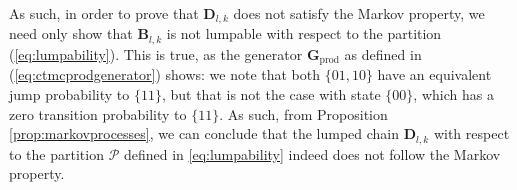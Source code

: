 As such, in order to prove that $\mathbf{D}_{l, k}$ does not satisfy the Markov property, we need only show that $\mathbf{B}_{l, k}$ is not lumpable with respect to the partition (\ref{eq:lumpability}). This is true, as the generator $\mathbf{G}_{\text{prod}}$ as defined in (\ref{eq:ctmcprodgenerator}) shows: we note that both $\{01, 10\}$ have an equivalent jump probability to $\{11\}$, but that is not the case with state $\{00\}$, which has a zero transition probability to $\{11\}$. As such, from Proposition \ref{prop:markovprocesses}, we can conclude that the lumped chain $\mathbf{D}_{l, k}$ with respect to the partition $\mathcal{P}$ defined in \ref{eq:lumpability} indeed does not follow the Markov property.